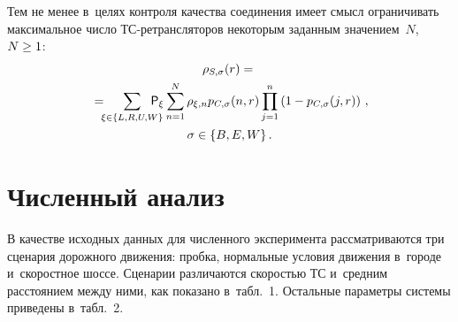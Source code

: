 \begin{multicols}{2}
     Тем не менее в~целях контроля качества соединения имеет смысл 
ограничивать максимальное число ТС-ре\-транс\-ля\-то\-ров некоторым 
заданным значением~$N$, $N\hm\geq 1$:
     \begin{multline*}
     \rho_{S,\sigma}(r)={}\\
     {}= \!\!\!\sum\limits_{\xi\in \{L,R,U,W\}}\!\!\!\!\!\!\! {\sf P}_\xi 
\sum\limits_{n=1}^N \rho_{\xi,n} p_{C,\sigma} (n,r) \prod\limits^n_{j=1} \left( 
1-p_{C,\sigma} (j,r)\right)\,,\\
     \sigma\in\{B,E,W\}\,.
     \end{multline*}
     
     \vspace*{-18pt}

\section{Численный анализ}

\vspace*{-3pt}

     В качестве исходных данных для численного эксперимента 
рассматриваются три сценария дорожного движения: проб\-ка, нормальные 
условия движения в~городе и~скоростное шоссе. Сценарии различаются  
ско\-ростью ТС и~средним расстоянием между ними, как показано в~табл.~1. 
Остальные па\-ра\-мет\-ры сис\-те\-мы приведены в~табл.~2.

\begin{figure*} %
\vspace*{1pt}
\begin{center}
   \mbox{%
\epsfxsize=84.218mm
}
\end{center}
\vspace*{-11pt}
\vspace*{-5pt}
\end{figure*}



\end{multicols}
